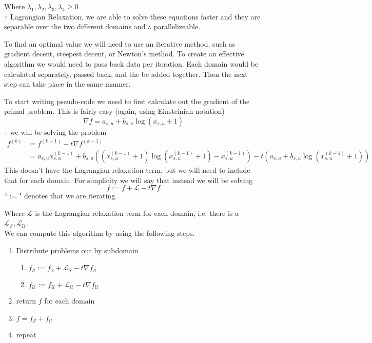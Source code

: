 \documentclass[12pt,letter]{article}
\begin{document}
Where $\lambda_1, \lambda_2, \lambda_3, \lambda_4 \geq 0$\\
$\because$ Lagrangian Relaxation, we are able to solve these equations faster 
and they are separable over the two different domains and $\therefore$ 
parallelizeable. 

To find an optimal value we will need to use an iterative method, such as
gradient decent, steepest decent, or Newton's method. 
To create an effective algorithm we would need to pass back data per iteration.
Each domain would be calculated separately, passed back, and the be added together.
Then the next step can take place in the same manner.

To start writing pseudo-code we need to first calculate out the gradient of the 
primal problem. This is fairly easy (again, using Einsteinian notation)
\[
\nabla f = a_{s,u} + b_{s,u}\log(x_{s,u}+1)
\]
$\therefore$ we will be solving the problem
\begin{align*}
f^{(k)} &= f^{(k-1)} - t\nabla f^{(k-1)} \\
	&= a_{s,u}x^{(k-1)}_{s,u} + b_{s,u}((x^{(k-1)}_{s,u}+1)
	   \log(x^{(k-1)}_{s,u}+1)-x^{(k-1)}_{s,u}) 
	   - t(a_{s,u} + b_{s,u}\log(x^{(k-1)}_{s,u}+1))
\end{align*}
This doesn't have the Lagrangian relaxation term, but we will need to include that
for each domain. For simplicity we will say that instead we will be solving
\[
f := f + \mathcal{L} - t\nabla f
\]
``$:=$" denotes that we are iterating. 

Where $\mathcal{L}$ is the Lagrangian relaxation term for each domain, i.e. there
is a $\mathcal{L}_{\mathcal{S}}, \mathcal{L}_{\mathcal{U}}$.
\\

We can compute this algorithm by using the following steps.
\begin{enumerate}
\item Distribute problems out by subdomain
   \begin{enumerate}
   \item $f_{\mathcal{S}}:= f_{\mathcal{S}} + \mathcal{L}_{\mathcal{S}} - t \nabla f_{\mathcal{S}}$
   \item $f_{\mathcal{U}}:= f_{\mathcal{U}} + \mathcal{L}_{\mathcal{U}} - t \nabla f_{\mathcal{U}}$
   \end{enumerate}
\item return $f$ for each domain
\item $f = f_{\mathcal{S}} + f_{\mathcal{U}}$
\item repeat
\end{enumerate}
\end{document}
